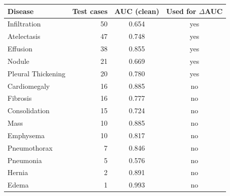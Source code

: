 \begin{tabular}{@{}lrcc@{}}
\toprule
\textbf{Disease} & \textbf{Test cases} & \textbf{AUC (clean)} & \textbf{Used for $\Delta$AUC} \\
\midrule
Infiltration & 50 & 0.654 & yes \\
Atelectasis & 47 & 0.748 & yes \\
Effusion & 38 & 0.855 & yes \\
Nodule & 21 & 0.669 & yes \\
Pleural Thickening & 20 & 0.780 & yes \\
Cardiomegaly & 16 & 0.885 & no \\
Fibrosis & 16 & 0.777 & no \\
Consolidation & 15 & 0.724 & no \\
Mass & 10 & 0.885 & no \\
Emphysema & 10 & 0.817 & no \\
Pneumothorax & 7 & 0.846 & no \\
Pneumonia & 5 & 0.576 & no \\
Hernia & 2 & 0.891 & no \\
Edema & 1 & 0.993 & no \\
\bottomrule
\end{tabular}
